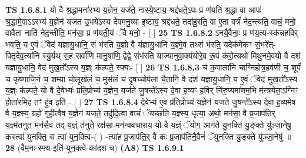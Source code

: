 \documentclass[17pt]{extarticle}
\begin{document}
                                        \textbf{ TS 1.6.8.1} \newline
                  यो वै श्र॒द्धामना॑रभ्य य॒ज्ञेन॒ यज॑ते॒ नास्ये॒ष्टाय॒ श्रद्द॑धते॒ऽपः प्र ण॑यति श्र॒द्धा वा आपः॑ श्र॒द्धामे॒वाऽऽरभ्य॑ य॒ज्ञेन॑ यजत उ॒भये᳚ऽस्य देवमनु॒ष्या इ॒ष्टाय॒ श्रद्द॑धते॒ तदा॑हु॒रति॒ वा ए॒ता वर्त्रं॑ नेद॒न्त्यति॒ वाचं॒ मनो॒ वावैता नाति॑ नेद॒न्तीति॒ मन॑सा॒ प्र ण॑यती॒यं ॅवै मनो॒ - [ ] \textbf{  25} \newline
                  \newline
                                \textbf{ TS 1.6.8.2} \newline
                  ऽनयै॒वैनाः॒ प्र ण॑य॒त्य-स्क॑न्नहविर् भवति॒ य ए॒वं ॅवेद॑ यज्ञायु॒धानि॒ सं भ॑रति य॒ज्ञो वै य॑ज्ञायु॒धानि॑ य॒ज्ञ्मे॒व तथ्सं भ॑रति॒ यदेक॑मेकꣳ सं॒भरे᳚त्-पितृदेव॒त्या॑नि स्यु॒र्यथ् स॒ह सर्वा॑णि मानु॒षाणि॒ द्वेद्वे॒ संभ॑रति याज्यानुवा॒क्य॑योरे॒व रू॒पं क॑रो॒त्यथो॑ मिथु॒नमे॒वयो वै दश॑ यज्ञायु॒धानि॒ वेद॑ मुख॒तो᳚ऽस्य य॒ज्ञ्ः क॑ल्पते॒ स्फ्यः- [ ] \textbf{  26} \newline
                  \newline
                                \textbf{ TS 1.6.8.3} \newline
                  च॑ क॒पाला॑नि चाग्निहोत्र॒हव॑णी च॒ शूर्पं॑ च कृष्णाजि॒नं च॒ शम्या॑ चो॒लूख॑लं च॒ मुस॑लं च दृ॒षच्चोप॑ला चै॒तानि॒ वै दश॑ यज्ञायु॒धानि॒ य ए॒वं ॅवेद॑ मुख॒तो᳚ऽस्य य॒ज्ञ्ः क॑ल्पते॒ यो वै दे॒वेभ्यः॑ प्रति॒प्रोच्य॑ य॒ज्ञेन॒ यज॑ते जु॒षन्ते᳚ऽस्य दे॒वा ह॒व्यꣳ ह॒विर् नि॑रु॒प्यमा॑णम॒भि म॑न्त्रयेता॒ऽग्निꣳ होता॑रमि॒ह तꣳ हु॑व॒ इति॑ - [ ] \textbf{  27} \newline
                  \newline
                                \textbf{ TS 1.6.8.4} \newline
                  दे॒वेभ्य॑ ए॒व प्र॑ति॒प्रोच्य॑ य॒ज्ञेन॑ यजते जु॒षन्ते᳚ऽस्य दे॒वा ह॒व्यमे॒ष वै य॒ज्ञ्स्य॒ ग्रहो॑ गृही॒त्वैव य॒ज्ञेन॑ यजते॒ तदु॑दि॒त्वा वाचं॑ ॅयच्छति य॒ज्ञ्स्य॒ धृत्या॒ अथो॒ मन॑सा॒ वै प्र॒जाप॑तिर् य॒ज्ञ्म॑तनुत॒ मन॑सै॒व तद्-य॒ज्ञ्ं त॑नुते॒ रक्ष॑सा॒-मन॑न्ववचाराय॒ यो वै य॒ज्ञ्ं ॅयोग॒ आग॑ते यु॒नक्ति॑ यु॒ङ्क्ते यु॑ञ्जा॒नेषु॒ कस्त्वा॑ युनक्ति॒ स त्वा॑ युन॒क्त्वि-( ) -त्या॑ह प्र॒जाप॑ति॒र् वै कः प्र॒जाप॑तिनै॒वैनं॑ ॅयुनक्ति यु॒ङ्क्ते यु॑ञ्जा॒नेषु॑ ॥ \textbf{  28} \newline
                  \newline
                      (वैम॒नः-स्फ्य-इति॑-युन॒क्त्वे-का॑दश च)  \textbf{(A8)} \newline \newline
                                        \textbf{ TS 1.6.9.1} \newline
\end{document}
